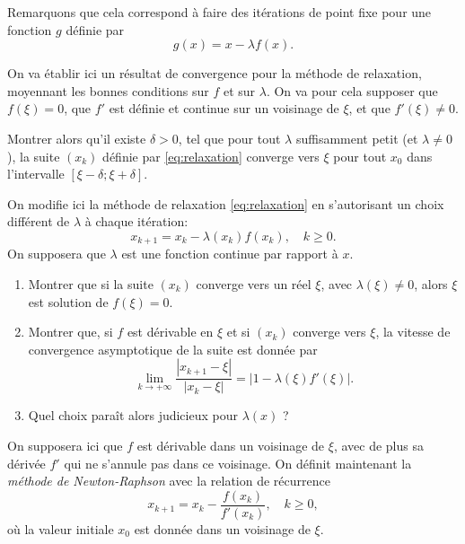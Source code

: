 \medskip

Remarquons que cela correspond à faire des itérations de point fixe pour une fonction $g$ définie par
\[
g(x) = x - \lambda f(x).
\]

\medskip

\begin{exercice}

On va établir ici un résultat de convergence pour la méthode de relaxation, moyennant les bonnes conditions sur $f$ et sur $\lambda$. 
On va pour cela supposer que $f(\xi)=0$, que $f'$ est définie et continue sur un voisinage de $\xi$, et que $f'(\xi)\neq0$.

Montrer alors qu'il existe $\delta > 0$, tel que pour tout $\lambda$ suffisamment petit (et $\lambda \neq 0$), la suite $(x_k)$ définie par \eqref{eq:relaxation} converge vers $\xi$ pour tout $x_0$ dans l'intervalle $[\xi - \delta ; \xi + \delta ]$.

\end{exercice}

\medskip

\begin{exercice}

On modifie ici la méthode de relaxation \eqref{eq:relaxation} en s'autorisant un choix différent de $\lambda$ à chaque itération:
\[
x_{k+1} = x_k - \lambda(x_k) f(x_k), \quad k\geq0.
\]
On supposera que $\lambda$ est une fonction continue par rapport à $x$.

\begin{enumerate}

\item Montrer que si la suite $(x_k)$ converge vers un réel $\xi$, avec $\lambda(\xi)\neq0$, alors $\xi$ est solution de $f(\xi)=0$.

\item Montrer que, si $f$ est dérivable en $\xi$ et si $(x_k)$ converge vers $\xi$, la vitesse de convergence asymptotique de la suite est donnée par 
\[
\lim_{k\rightarrow +\infty} \frac{|x_{k+1} - \xi|}{| x_k - \xi|}
= | 1 - \lambda(\xi) f'(\xi)|.
\]

\item Quel choix paraît alors judicieux pour $\lambda(x)$ ?

\end{enumerate}

\end{exercice}

\medskip

On supposera ici que $f$ est dérivable dans un voisinage de $\xi$, avec de plus sa dérivée $f'$ qui ne s'annule pas dans ce voisinage.
On définit maintenant la \emph{méthode de Newton-Raphson} avec la relation de récurrence
\begin{equation} \label{eq:newton}
x_{k+1} = x_k - \frac{f(x_k)}{f'(x_k)}, \quad k\geq0,
\end{equation}
où la valeur initiale $x_0$ est donnée dans un voisinage de $\xi$.

